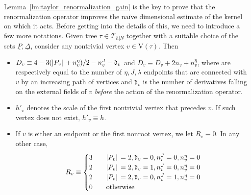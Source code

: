 \documentclass[a4paper, 11pt]{article}
\newcommand{\vrt}{\mathrm{V}}								%
\newcommand{\trees}{\mathcal{T}}							%
\theoremstyle{thm}
\begin{document}
Lemma~\ref{lm:taylor_renormalization_gain} is the key to prove that the renormalization operator improves the na\"ive dimensional estimate of the kernel on which it acts. Before getting into the details of this, we need to introduce a few more notations. Given tree $\tau \in \trees_{h|N}$ together with a suitable choice of the sets $\underline{P}, \underline{\Delta}$, consider any nontrivial vertex $v \in \vrt(\tau)$. Then
\begin{itemize}
\item $D_v \equiv 4 - 3(\abs*{P_v} + n^\eta_v)/2 - n^J_v - \mathfrak{d}_v$ and $\bar{D}_v \equiv D_v + 2 n_v + n^\eta_v$, where are respectively equal to the number of $\eta, J, \lambda$ endpoints that are connected with $v$ by an increasing path of vertices and $\mathfrak{d}_v$ is the number of derivatives falling on the external fields of $v$ \emph{before} the action of the renormalization operator.
\item $h'_v$ denotes the scale of the first nontrivial vertex that precedes $v$. If such vertex does not exist, $h'_v \equiv h$.
\item If $v$ is either an endpoint or the first nonroot vertex, we let $R_v \equiv 0$. In any other case,
\begin{equation}
R_v \equiv
\begin{cases}
3	&	\quad \abs*{P_v} = 2, \mathfrak{d}_v = 0, n^J_v = 0, n^\eta_v = 0 \\
2 	&	\quad \abs*{P_v} = 2, \mathfrak{d}_v = 1, n^J_v = 0, n^\eta_v = 0 \\
2	&	\quad \abs*{P_v} = 2, \mathfrak{d}_v = 0, n^J_v = 1, n^\eta_v = 0 \\
0	&	\quad \text{otherwise}
\end{cases}
\end{equation}
\end{itemize}
\end{document}
